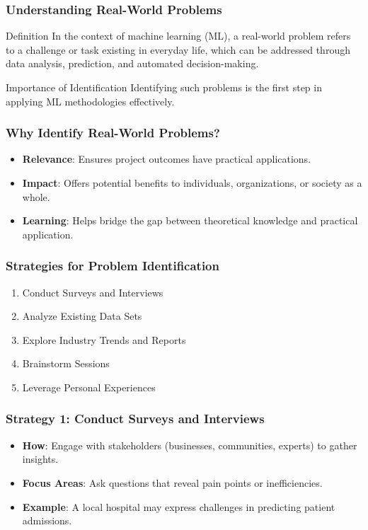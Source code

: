 \documentclass{beamer}
\begin{document}
\begin{frame}[fragile]
    \frametitle{Understanding Real-World Problems}
    \begin{block}{Definition}
        In the context of machine learning (ML), a real-world problem refers to a challenge or task existing in everyday life, which can be addressed through data analysis, prediction, and automated decision-making. 
    \end{block}
    
    \begin{block}{Importance of Identification}
        Identifying such problems is the first step in applying ML methodologies effectively.
    \end{block}
\end{frame}

\begin{frame}[fragile]
    \frametitle{Why Identify Real-World Problems?}
    \begin{itemize}
        \item \textbf{Relevance}: Ensures project outcomes have practical applications.
        \item \textbf{Impact}: Offers potential benefits to individuals, organizations, or society as a whole.
        \item \textbf{Learning}: Helps bridge the gap between theoretical knowledge and practical application.
    \end{itemize}
\end{frame}

\begin{frame}[fragile]
    \frametitle{Strategies for Problem Identification}
    \begin{enumerate}
        \item Conduct Surveys and Interviews
        \item Analyze Existing Data Sets
        \item Explore Industry Trends and Reports
        \item Brainstorm Sessions
        \item Leverage Personal Experiences
    \end{enumerate}
\end{frame}

\begin{frame}[fragile]
    \frametitle{Strategy 1: Conduct Surveys and Interviews}
    \begin{itemize}
        \item \textbf{How}: Engage with stakeholders (businesses, communities, experts) to gather insights.
        \item \textbf{Focus Areas}: Ask questions that reveal pain points or inefficiencies.
        \item \textbf{Example}: A local hospital may express challenges in predicting patient admissions.
    \end{itemize}
\end{frame}
\end{document}
